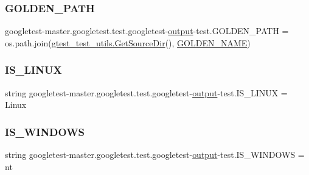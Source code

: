 \subsubsection{\texorpdfstring{GOLDEN\_PATH}{GOLDEN\_PATH}}
{\footnotesize\ttfamily googletest-\/master.\+googletest.\+test.\+googletest-\/\mbox{\hyperlink{namespacegoogletest-master_1_1googletest_1_1test_1_1googletest-output-test_a734f0a5bd94ba038f4350763c6977129}{output}}-\/test.\+G\+O\+L\+D\+E\+N\+\_\+\+P\+A\+TH = os.\+path.\+join(\mbox{\hyperlink{namespacegoogletest-master_1_1googletest_1_1test_1_1gtest__test__utils_a5b2487a7b4864fb1c1fd6d5c283062ef}{gtest\+\_\+test\+\_\+utils.\+Get\+Source\+Dir}}(), \mbox{\hyperlink{namespacegoogletest-master_1_1googletest_1_1test_1_1googletest-output-test_a54841f0cc54659ea2d823867932dd1f6}{G\+O\+L\+D\+E\+N\+\_\+\+N\+A\+ME}})}

\mbox{\label{namespacegoogletest-master_1_1googletest_1_1test_1_1googletest-output-test_a3de5adb5b70e7087ad52c14cf12fe073}} 
\subsubsection{\texorpdfstring{IS\_LINUX}{IS\_LINUX}}
{\footnotesize\ttfamily string googletest-\/master.\+googletest.\+test.\+googletest-\/\mbox{\hyperlink{namespacegoogletest-master_1_1googletest_1_1test_1_1googletest-output-test_a734f0a5bd94ba038f4350763c6977129}{output}}-\/test.\+I\+S\+\_\+\+L\+I\+N\+UX = \textquotesingle{}Linux\textquotesingle{}}

\mbox{\label{namespacegoogletest-master_1_1googletest_1_1test_1_1googletest-output-test_ad9e2db1e3e3cfd312dc333e8bdce1b7d}} 
\subsubsection{\texorpdfstring{IS\_WINDOWS}{IS\_WINDOWS}}
{\footnotesize\ttfamily string googletest-\/master.\+googletest.\+test.\+googletest-\/\mbox{\hyperlink{namespacegoogletest-master_1_1googletest_1_1test_1_1googletest-output-test_a734f0a5bd94ba038f4350763c6977129}{output}}-\/test.\+I\+S\+\_\+\+W\+I\+N\+D\+O\+WS = \textquotesingle{}nt\textquotesingle{}}

